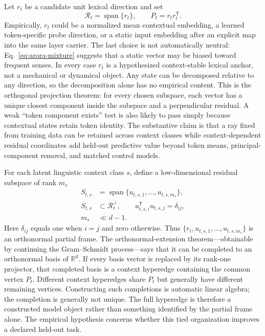 \documentclass[
  aps,
  reprint,
  superscriptaddress,
  floatfix,
  nofootinbib,
  longbibliography
]{revtex4-2}
\newcommand{\R}{\mathbb{R}}
\newcommand{\T}{^{\mathsf{T}}}
\DeclareMathOperator{\spanop}{span}
\begin{document}
Let $r_t$ be a candidate unit lexical direction and set
%
\begin{equation}
\label{eq:reference-direction}
\mathcal R_t=\spanop\{r_t\},
\qquad P_t=r_t r_t\T .
\end{equation}
%
Empirically, $r_t$ could be a normalized mean contextual embedding, a learned
token-specific probe direction, or a static input embedding after an explicit
map into the same layer carrier.  The last choice is not automatically neutral:
Eq.~\eqref{eq:arora-mixture} suggests that a static vector may be biased toward
frequent senses.  In every case $r_t$ is a hypothesized context-stable lexical
anchor, not a mechanical or dynamical object.
Any state can be decomposed relative to any direction, so the decomposition
alone has no empirical content.  This is the orthogonal projection theorem:
for every chosen subspace, each vector has a unique closest component inside
the subspace and a perpendicular residual.  A weak ``token component exists''
test is also likely to pass simply because contextual states retain token
identity.  The substantive claim is that a ray fixed from training data can be
retained across context classes while context-dependent residual coordinates
add held-out predictive value beyond token means, principal-component removal,
and matched control models.

For each latent linguistic context class $s$, define a low-dimensional residual subspace
of rank $m_s$
%
\begin{equation}
\label{eq:sense-subspace}
\begin{aligned}
S_{t,s}&=\spanop\{u_{t,s,1},\dots,u_{t,s,m_s}\},\\
S_{t,s}&\subset\mathcal R_t^\perp,
\qquad u_{t,s,i}\T u_{t,s,j}=\delta_{ij},\\
m_s&\ll d-1 .
\end{aligned}
\end{equation}
%
Here $\delta_{ij}$ equals one when $i=j$ and zero otherwise.  Thus
$\{r_t,u_{t,s,1},\ldots,u_{t,s,m_s}\}$ is an orthonormal partial frame.  The
orthonormal-extension theorem---obtainable by continuing the Gram--Schmidt
process---says that it can be completed to an orthonormal basis of $\R^d$.
If every basis vector is replaced by its rank-one projector, that completed
basis is a context hyperedge containing the common vertex $P_t$.  Different
context hyperedges share $P_t$ but generally have different remaining
vertices.  Constructing such completions is automatic linear algebra; the
completion is generally not unique.  The full hyperedge is therefore a
constructed model object rather than something identified by the partial frame
alone.  The empirical hypothesis concerns whether this tied organization
improves a declared held-out task.
\end{document}
